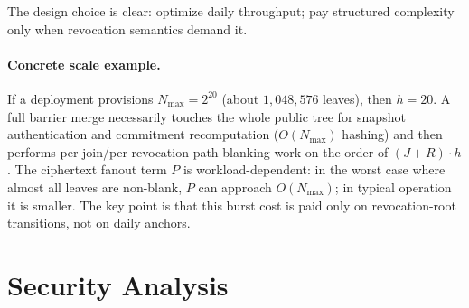 \documentclass[11pt]{article}
\begin{document}
The design choice is clear: optimize daily throughput; pay structured complexity only when revocation semantics demand it.

\paragraph{Concrete scale example.}
If a deployment provisions \(N_{\max}=2^{20}\) (about \(1{,}048{,}576\) leaves), then \(h=20\). A full barrier merge necessarily touches the whole public tree for snapshot authentication and commitment recomputation (\(O(N_{\max})\) hashing) and then performs per-join/per-revocation path blanking work on the order of \((J+R)\cdot h\). The ciphertext fanout term \(P\) is workload-dependent: in the worst case where almost all leaves are non-blank, \(P\) can approach \(O(N_{\max})\); in typical operation it is smaller. The key point is that this burst cost is paid only on revocation-root transitions, not on daily anchors.

\section{Security Analysis}
\end{document}

